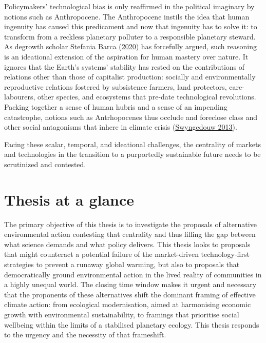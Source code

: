 \documentclass[a4paper, nobind]{templates/ociamthesis}
\begin{document}
Policymakers' technological bias is only reaffirmed in the political imaginary by notions such as Anthropocene. The Anthropocene instils the idea that human ingenuity has caused this predicament and now that ingenuity has to solve it: to transform from a reckless planetary polluter to a responsible planetary steward. As degrowth scholar Stefania Barca (\protect\hyperlink{ref-barca_forces_2020}{2020}) has forcefully argued, such reasoning is an ideational extension of the aspiration for human mastery over nature. It ignores that the Earth's systems' stability has rested on the contributions of relations other than those of capitalist production: socially and environmentally reproductive relations fostered by subsistence farmers, land protectors, care-labourers, other species, and ecosystems that pre-date technological revolutions. Packing together a sense of human hubris and a sense of an impending catastrophe, notions such as Antrhopocenes thus occlude and foreclose class and other social antagonisms that inhere in climate crisis (\protect\hyperlink{ref-swyngedouw_apocalypse_2013}{Swyngedouw 2013}).

Facing these scalar, temporal, and ideational challenges, the centrality of markets and technologies in the transition to a purportedly sustainable future needs to be scrutinized and contested.

\hypertarget{thesis-at-a-glance}{%
\section{Thesis at a glance}\label{thesis-at-a-glance}}

The primary objective of this thesis is to investigate the proposals of alternative environmental action contesting that centrality and thus filling the gap between what science demands and what policy delivers. This thesis looks to proposals that might counteract a potential failure of the market-driven technology-first strategies to prevent a runaway global warming, but also to proposals that democratically ground environmental action in the lived reality of communities in a highly unequal world. The closing time window makes it urgent and necessary that the proponents of these alternatives shift the dominant framing of effective climate action: from ecological modernisation, aimed at harmonising economic growth with environmental sustainability, to framings that prioritise social wellbeing within the limits of a stabilised planetary ecology. This thesis responds to the urgency and the necessity of that frameshift.
\end{document}
